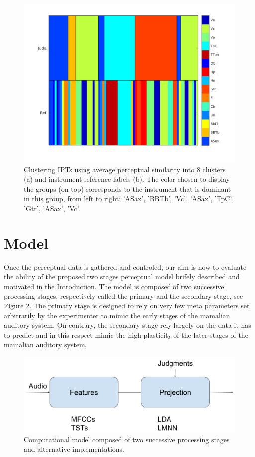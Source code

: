 \documentclass{article}
\newcommand{\ipts}{IPTs\xspace}
\begin{document}
\begin{figure}
\center
\includegraphics[width = \textwidth]{figures/groupInstruments.png}
\caption{Clustering \ipts using average perceptual similarity into 8 clusters (a) and instrument reference labels (b). The color chosen to display the groups (on top) corresponds  to the instrument that is dominant in this group, from left to right: 'ASax', 'BBTb', 'Vc', 'ASax', 'TpC', 'Gtr', 'ASax', 'Vc'.}
\label{fig:gi}
\end{figure}

\section{Model}\label{sec:model}

Once the perceptual data is gathered and controled, our aim is now to evaluate the ability of the proposed two stages perceptual model brifely described and motivated in the Introduction. The model is composed of two successive processing stages, respectively called the primary and the secondary stage, see Figure \ref{fig:model}. The primary stage is designed to rely on very few meta parameters set arbitrarily by the experimenter to mimic the early stages of the mamalian auditory system. On contrary, the secondary stage rely largely on the data it has to predict and in this respect mimic the high plasticity of the later stages of the mamalian auditory system.

\begin{figure}[t]
\center
\includegraphics[width = \textwidth]{figures/spontaneousSimilarity.png}
\caption{Computational model composed of two successive processing stages and alternative implementations.}
\label{fig:model}
\end{figure}
\end{document}
